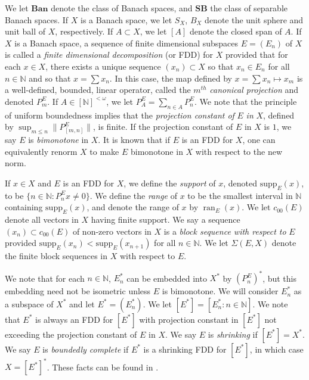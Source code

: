 \documentclass[12pt]{amsart}
\theoremstyle{definition}
\newcommand{\fin}{[\mathbb{N}]^{<\omega}}
\newcommand{\nn}{\mathbb{N}}
\newcommand{\supp}{\mathrm{supp}}
\DeclareMathOperator{\ran}{ran}
\begin{document}
We let $\textbf{Ban}$ denote the class of Banach spaces, and $\textbf{SB}$ the class of separable Banach spaces.  If $X$ is a Banach space, we let $S_X$, $B_X$ denote the unit sphere and unit ball of $X$, respectively.  If $A\subset X$, we let $[A]$ denote the closed span of $A$.  If $X$ is a Banach space, a sequence of finite dimensional subspaces $E=(E_n)$ of $X$ is called a \emph{finite dimensional decomposition} (or FDD) for $X$ provided that for each $x\in X$, there exists a unique sequence $(x_n)\subset X$ so that $x_n\in E_n$ for all $n\in \nn$ and so that $x=\sum x_n$.  In this case, the map defined by $x=\sum x_n\mapsto x_m$ is a well-defined, bounded, linear operator, called the $m^{th}$ \emph{canonical projection} and denoted $P^E_m$.  If $A\in \fin$, we let $P^E_A= \sum_{n\in A}P^E_n$.  We note that the principle of uniform boundedness implies that the \emph{projection constant of} $E$ \emph{in} $X$, defined by $\sup_{m\leqslant n}\|P^E_{[m,n]}\|$, is finite.  If the projection constant of $E$ in $X$ is $1$, we say $E$ is \emph{bimonotone} in $X$.  It is known that if $E$ is an FDD for $X$, one can equivalently renorm $X$ to make $E$ bimonotone in $X$ with respect to the new norm.  

If $x\in X$ and $E$ is an FDD for $X$, we define the \emph{support} of $x$, denoted $\supp_E(x)$, to be $\{n\in \nn: P^E_nx\neq 0\}$.  We define the \emph{range} of $x$ to be the smallest interval in $\nn$ containing $\supp_E(x)$, and denote the range of $x$ by $\ran_E(x)$.  We let $c_{00}(E)$ denote all vectors in $X$ having finite support. We say a sequence $(x_n)\subset c_{00}(E)$ of non-zero vectors in $X$ is a \emph{block sequence with respect to} $E$ provided $\supp_E(x_n)<\supp_E(x_{n+1})$ for all $n\in \nn$.  We let $\Sigma(E,X)$ denote the finite block sequences in $X$ with respect to $E$.  

We note that for each $n\in \nn$, $E_n^*$ can be embedded into $X^*$ by $(P_n^E)^*$, but this embedding need not be isometric unless $E$ is bimonotone.  We will consider $E_n^*$ as a subspace of $X^*$ and let $E^*=(E_n^*)$.  We let $[E^*]=[E_n^*:n\in \nn]$.  We note that $E^*$ is always an FDD for $[E^*]$ with projection constant in $[E^*]$ not exceeding the projection constant of $E$ in $X$.  We say $E$ is \emph{shrinking} if $[E^*]=X^*$.  We say $E$ is \emph{boundedly complete} if $E^*$ is a shrinking FDD for $[E^*]$, in which case $X=[E^*]^*$.  These facts can be found in \cite{FHHMZ}.
\end{document}
